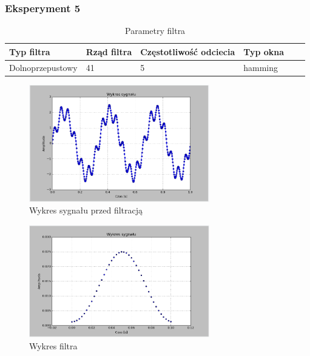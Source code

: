 \documentclass{article}
\begin{document}
{        \subsubsection{Eksperyment 5} {
            \begin{table}[h!]
            \centering
            \begin{tabular}{|l|l|l|l|l|l|}
            \hline
            Typ filtra & Rząd filtra & Częstotliwość odciecia & Typ okna  \\\hline
            Dolnoprzepustowy & 41 & 5 & hamming     \\\hline
            \end{tabular}
            \caption{Parametry filtra}
            \end{table}
            \begin{figure}[h!]
                \centering
                \includegraphics[width=0.7\textwidth]{img/sig.png}
                \caption{Wykres sygnału przed filtracją}
            \end{figure}
            \begin{figure}[h!]
                \centering
                \includegraphics[width=0.7\textwidth]{img/fil9.png}
                \caption{Wykres filtra}
            \end{figure}

}}
\end{document}

